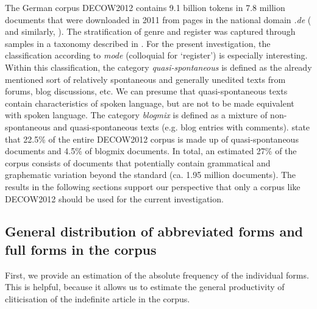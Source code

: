 The German corpus DECOW2012 contains 9.1 billion tokens in 7.8 million documents that were downloaded in 2011 from pages in the national domain \textit{.de} (\citealt{SchaeferBildhauer2012} and similarly, \citealt{BaroniEa2009}).
The stratification of genre and register was captured through samples in a taxonomy described in \citet{Scharoff2006}.
For the present investigation, the classification according to \textit{mode} (colloquial for `register') is especially interesting.
Within this classification, the category \textit{quasi-spontaneous} is defined as the already mentioned sort of relatively spontaneous and generally unedited texts from forums, blog discussions, etc.
We can presume that quasi-spontaneous texts contain characteristics of spoken language, but are not to be made equivalent with spoken language. 
The category \textit{blogmix} is defined as a mixture of non-spontaneous and quasi-spontaneous texts (e.g. blog entries with comments).
\citet[492]{SchaeferBildhauer2012} state that 22.5\% of the entire DECOW2012 corpus is made up of quasi-spontaneous documents and 4.5\% of blogmix documents. 
In total, an estimated 27\% of the corpus consists of documents that potentially contain grammatical and graphematic variation beyond the standard (ca. 1.95 million documents).
The results in the following sections support our perspective that only a corpus like DECOW2012 should be used for the current investigation.

\subsection[General distribution of abbreviated forms and full forms]{General distribution of abbreviated forms and full forms in the corpus}
\label{subsec:22distribInCorpus}

First, we provide an estimation of the absolute frequency of the individual forms.
This is helpful, because it allows us to estimate the general productivity of cliticisation of the indefinite article in the corpus.

